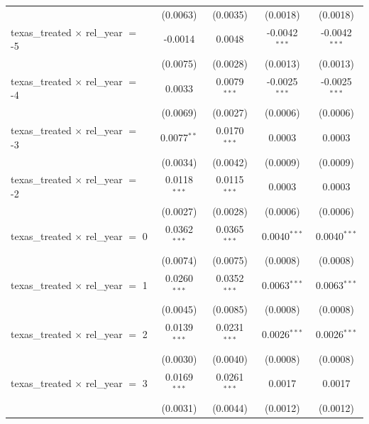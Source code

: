 \begin{tabular}{lcccc}
                                                & (0.0063)       & (0.0035)        & (0.0018)        & (0.0018)\\   
   texas\_treated $\times$ rel\_year $=$ -5     & -0.0014        & 0.0048          & -0.0042$^{***}$ & -0.0042$^{***}$\\   
                                                & (0.0075)       & (0.0028)        & (0.0013)        & (0.0013)\\   
   texas\_treated $\times$ rel\_year $=$ -4     & 0.0033         & 0.0079$^{***}$  & -0.0025$^{***}$ & -0.0025$^{***}$\\   
                                                & (0.0069)       & (0.0027)        & (0.0006)        & (0.0006)\\   
   texas\_treated $\times$ rel\_year $=$ -3     & 0.0077$^{**}$  & 0.0170$^{***}$  & 0.0003          & 0.0003\\   
                                                & (0.0034)       & (0.0042)        & (0.0009)        & (0.0009)\\   
   texas\_treated $\times$ rel\_year $=$ -2     & 0.0118$^{***}$ & 0.0115$^{***}$  & 0.0003          & 0.0003\\   
                                                & (0.0027)       & (0.0028)        & (0.0006)        & (0.0006)\\   
   texas\_treated $\times$ rel\_year $=$ 0      & 0.0362$^{***}$ & 0.0365$^{***}$  & 0.0040$^{***}$  & 0.0040$^{***}$\\   
                                                & (0.0074)       & (0.0075)        & (0.0008)        & (0.0008)\\   
   texas\_treated $\times$ rel\_year $=$ 1      & 0.0260$^{***}$ & 0.0352$^{***}$  & 0.0063$^{***}$  & 0.0063$^{***}$\\   
                                                & (0.0045)       & (0.0085)        & (0.0008)        & (0.0008)\\   
   texas\_treated $\times$ rel\_year $=$ 2      & 0.0139$^{***}$ & 0.0231$^{***}$  & 0.0026$^{***}$  & 0.0026$^{***}$\\   
                                                & (0.0030)       & (0.0040)        & (0.0008)        & (0.0008)\\   
   texas\_treated $\times$ rel\_year $=$ 3      & 0.0169$^{***}$ & 0.0261$^{***}$  & 0.0017          & 0.0017\\   
                                                & (0.0031)       & (0.0044)        & (0.0012)        & (0.0012)\\   

\end{tabular}
